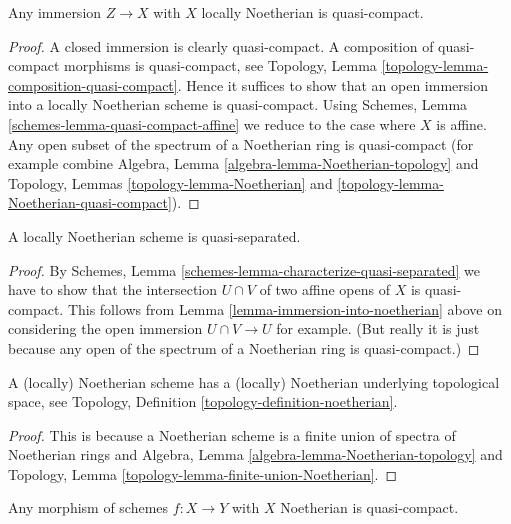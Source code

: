 \begin{lemma}
\label{lemma-immersion-into-noetherian}
Any immersion $Z \to X$ with $X$ locally Noetherian is quasi-compact.
\end{lemma}

\begin{proof}
A closed immersion is clearly quasi-compact.
A composition of quasi-compact morphisms is quasi-compact,
see Topology, Lemma \ref{topology-lemma-composition-quasi-compact}.
Hence it suffices to show that an open immersion into
a locally Noetherian scheme is quasi-compact.
Using Schemes, Lemma \ref{schemes-lemma-quasi-compact-affine}
we reduce to the case where $X$ is affine.
Any open subset of the spectrum of a Noetherian ring
is quasi-compact (for example
combine Algebra, Lemma \ref{algebra-lemma-Noetherian-topology} and
Topology, Lemmas \ref{topology-lemma-Noetherian} and
\ref{topology-lemma-Noetherian-quasi-compact}).
\end{proof}

\begin{lemma}
\label{lemma-locally-Noetherian-quasi-separated}
A locally Noetherian scheme is quasi-separated.
\end{lemma}

\begin{proof}
By Schemes, Lemma \ref{schemes-lemma-characterize-quasi-separated}
we have to show that the intersection $U \cap V$ of two
affine opens of $X$ is quasi-compact. This follows from
Lemma \ref{lemma-immersion-into-noetherian} above on
considering the open immersion $U \cap V \to U$ for example.
(But really it is just because any open of the spectrum of a
Noetherian ring is quasi-compact.)
\end{proof}

\begin{lemma}
\label{lemma-Noetherian-topology}
A (locally) Noetherian scheme has a (locally)
Noetherian underlying topological space,
see Topology, Definition \ref{topology-definition-noetherian}.
\end{lemma}

\begin{proof}
This is because a Noetherian scheme is a finite union of spectra
of Noetherian rings and
Algebra, Lemma \ref{algebra-lemma-Noetherian-topology} and
Topology, Lemma \ref{topology-lemma-finite-union-Noetherian}.
\end{proof}

\begin{lemma}
\label{lemma-morphism-Noetherian-schemes-quasi-compact}
Any morphism of schemes $f : X \to Y$ with $X$ Noetherian
is quasi-compact.
\end{lemma}


